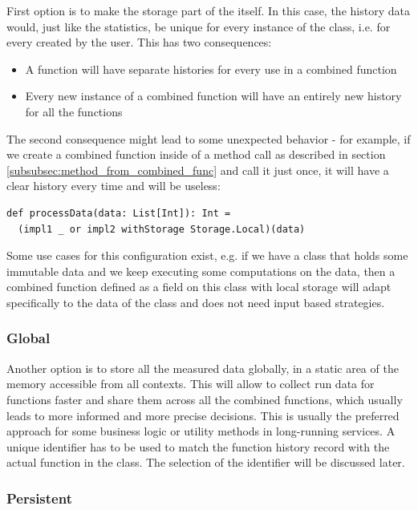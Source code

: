 First option is to make the storage part of the  itself. In this case, the history data would, just like the statistics, be unique for every instance of the class, i.e. for every  created by the user. This has two consequences:

\begin{itemize}
	\item A function will have separate histories for every use in a combined function
	\item Every new instance of a combined function will have an entirely new history for all the functions
\end{itemize}

The second consequence might lead to some unexpected behavior - for example, if we create a combined function inside of a method call as described in section \ref{subsubsec:method_from_combined_func} and call it just once, it will have a clear history every time and will be useless:

\lstset{style=Scala}
\begin{lstlisting}
def processData(data: List[Int]): Int = 
  (impl1 _ or impl2 withStorage Storage.Local)(data)
\end{lstlisting}

Some use cases for this configuration exist, e.g. if we have a class that holds some immutable data and we keep executing some computations on the data, then a combined function defined as a field on this class with local storage will adapt specifically to the data of the class and does not need input based strategies.

\subsubsection{Global}

Another option is to store all the measured data globally, in a static area of the memory accessible from all contexts. This will allow to collect run data for functions faster and share them across all the combined functions, which usually leads to more informed and more precise decisions. This is usually the preferred approach for some business logic or utility methods in long-running services. A unique identifier has to be used to match the function history record with the actual function in the  class. The selection of the identifier will be discussed later.

\subsubsection{Persistent}

